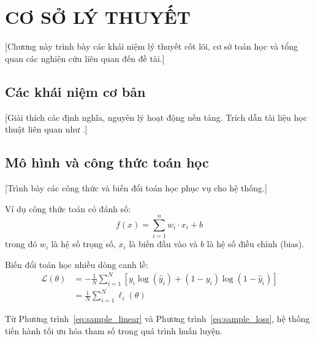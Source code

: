 \chapter{CƠ SỞ LÝ THUYẾT}
\label{chap:theory}

[Chương này trình bày các khái niệm lý thuyết cốt lõi, cơ sở toán học và tổng quan các nghiên cứu liên quan đến đề tài.]

\section{Các khái niệm cơ bản}
\label{sec:concepts}

[Giải thích các định nghĩa, nguyên lý hoạt động nền tảng. Trích dẫn tài liệu học thuật liên quan như \cite{sample_conference, sample_standard}.]

\section{Mô hình và công thức toán học}
\label{sec:math}

[Trình bày các công thức và biến đổi toán học phục vụ cho hệ thống.]

Ví dụ công thức toán có đánh số:
\begin{equation}
    f(x) = \sum_{i=1}^{n} w_i \cdot x_i + b
    \label{eq:sample_linear}
\end{equation}
trong đó $w_i$ là hệ số trọng số, $x_i$ là biến đầu vào và $b$ là hệ số điều chỉnh (bias).

Biến đổi toán học nhiều dòng canh lề:
\begin{equation}
\begin{aligned}
    \mathcal{L}(\theta) &= -\frac{1}{N} \sum_{i=1}^{N} \left[ y_i \log(\hat{y}_i) + (1 - y_i) \log(1 - \hat{y}_i) \right] \\
    &= \frac{1}{N} \sum_{i=1}^{N} \ell_i(\theta)
\end{aligned}
\label{eq:sample_loss}
\end{equation}

Từ Phương trình~\eqref{eq:sample_linear} và Phương trình~\eqref{eq:sample_loss}, hệ thống tiến hành tối ưu hóa tham số trong quá trình huấn luyện.
